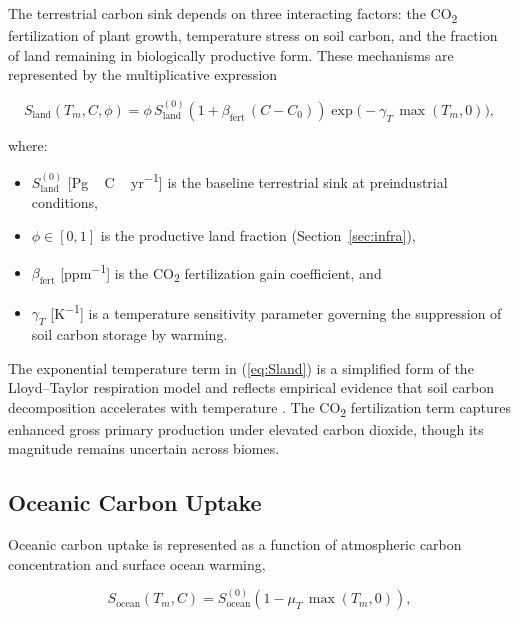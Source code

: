 \documentclass[12pt]{article}
\newcommand{\Slam}{S_{\mathrm{land}}}
\newcommand{\Soce}{S_{\mathrm{ocean}}}
\begin{document}
The terrestrial carbon sink depends on three interacting factors: the
CO\textsubscript{2} fertilization of plant growth, temperature stress on soil
carbon, and the fraction of land remaining in biologically productive form.
These mechanisms are represented by the multiplicative expression

\begin{equation}
  \Slam(T_m, C, \phi)
    = \phi\, S_{\mathrm{land}}^{(0)}
      \left(1 + \beta_{\mathrm{fert}}\,(C - C_0)\right)
      \exp\!\bigl(-\gamma_T\, \max(T_m, 0)\bigr),
  \label{eq:Sland}
\end{equation}

where:
\begin{itemize}
  \item $S_{\mathrm{land}}^{(0)}$ [\si{Pg\,C\,yr^{-1}}] is the baseline
        terrestrial sink at preindustrial conditions,
  \item $\phi \in [0,1]$ is the productive land fraction (Section~\ref{sec:infra}),
  \item $\beta_{\mathrm{fert}}$ [\si{ppm^{-1}}] is the CO\textsubscript{2}
        fertilization gain coefficient, and
  \item $\gamma_T$ [\si{K^{-1}}] is a temperature sensitivity parameter
        governing the suppression of soil carbon storage by warming.
\end{itemize}

The exponential temperature term in (\ref{eq:Sland}) is a simplified form of
the Lloyd--Taylor respiration model \citep{LloydTaylor1994} and reflects
empirical evidence that soil carbon decomposition accelerates with temperature
\citep{Davidson2006,Parton1987}.  The CO\textsubscript{2} fertilization term
captures enhanced gross primary production under elevated carbon dioxide,
though its magnitude remains uncertain across biomes.

\subsection{Oceanic Carbon Uptake}
\label{sec:ocean}

Oceanic carbon uptake is represented as a function of atmospheric carbon
concentration and surface ocean warming,

\begin{equation}
  \Soce(T_m, C)
    = S_{\mathrm{ocean}}^{(0)}
      \left(1 - \mu_T\, \max(T_m, 0)\right),
  \label{eq:Socean}
\end{equation}
\end{document}
